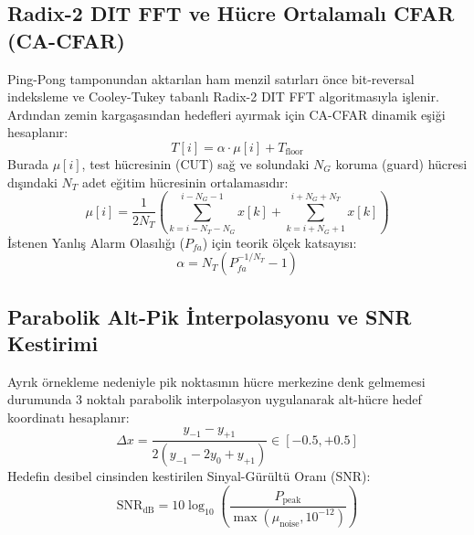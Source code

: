 \documentclass[11pt,a4paper]{article}
\begin{document}
\subsection{Radix-2 DIT FFT ve Hücre Ortalamalı CFAR (CA-CFAR)}
Ping-Pong tamponundan aktarılan ham menzil satırları önce bit-reversal indeksleme ve Cooley-Tukey tabanlı Radix-2 DIT FFT algoritmasıyla işlenir. Ardından zemin kargaşasından hedefleri ayırmak için CA-CFAR dinamik eşiği hesaplanır:
\begin{equation}
T[i] = \alpha \cdot \mu[i] + T_{\text{floor}}
\end{equation}
Burada $\mu[i]$, test hücresinin (CUT) sağ ve solundaki $N_G$ koruma (guard) hücresi dışındaki $N_T$ adet eğitim hücresinin ortalamasıdır:
\begin{equation}
\mu[i] = \frac{1}{2 N_T} \left( \sum_{k=i - N_T - N_G}^{i - N_G - 1} x[k] + \sum_{k=i + N_G + 1}^{i + N_G + N_T} x[k] \right)
\end{equation}
İstenen Yanlış Alarm Olasılığı ($P_{fa}$) için teorik ölçek katsayısı:
\begin{equation}
\alpha = N_T \left( P_{fa}^{-1/N_T} - 1 \right)
\end{equation}

\subsection{Parabolik Alt-Pik İnterpolasyonu ve SNR Kestirimi}
Ayrık örnekleme nedeniyle pik noktasının hücre merkezine denk gelmemesi durumunda 3 noktalı parabolik interpolasyon uygulanarak alt-hücre hedef koordinatı hesaplanır:
\begin{equation}
\Delta x = \frac{y_{-1} - y_{+1}}{2(y_{-1} - 2y_0 + y_{+1})} \in [-0.5, +0.5]
\end{equation}
Hedefin desibel cinsinden kestirilen Sinyal-Gürültü Oranı (SNR):
\begin{equation}
\text{SNR}_{\text{dB}} = 10 \log_{10}\left(\frac{P_{\text{peak}}}{\max(\mu_{\text{noise}}, 10^{-12})}\right)
\end{equation}
\end{document}
